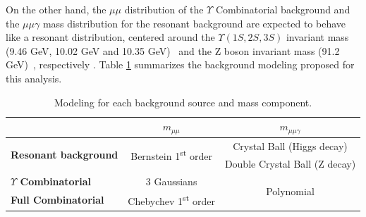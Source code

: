 On the other hand, the $\mu\mu$ distribution of the $\Upsilon$ Combinatorial background and the $\mu\mu\gamma$ mass distribution for the resonant background are expected to behave like a resonant distribution, centered around the $\Upsilon(1S, 2S, 3S)$ invariant mass (9.46 GeV, 10.02 GeV and 10.35 GeV)~\cite{pdg_2020} and the Z boson invariant mass (91.2 GeV)~\cite{pdg_2020}, respectively . Table \ref{tab:BckgModeling_Z} summarizes the background modeling proposed for this analysis.




\begin{table}[ht]
\begin{center}
\caption{Modeling for each background source and mass component.}
\begin{tabular}{l|c|c}
                         & $m_{\mu\mu}$                                          & $m_{\mu\mu\gamma}$       \\ \hline 
\multirow{2}{*}{\textbf{Resonant background} }      & \multirow{2}{*}{Bernstein 1\textsuperscript{st} order}                 & Crystal Ball (Higgs decay)    \\ 
                                  &                       & Double Crystal Ball (Z decay)    \\ \hline
\textbf{$\Upsilon$ Combinatorial} & 3 Gaussians & \multirow{2}{*}{Polynomial}  \\ \cline{1-2}
\textbf{Full Combinatorial}       & Chebychev 1\textsuperscript{st} order                 &                          \\ 
\end{tabular}

\label{tab:BckgModeling_Z}
\end{center}
\end{table}


